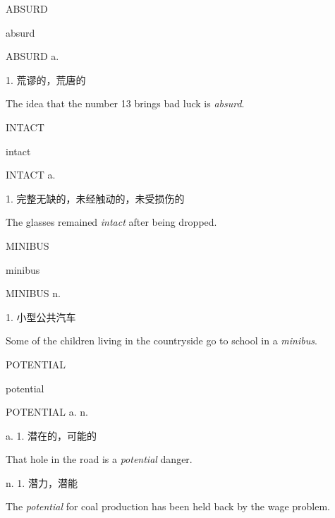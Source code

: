 \begin{flashcard}{
ABSURD

absurd
}
\begin{center}
ABSURD a. 
\end{center}
1. 荒谬的，荒唐的

The idea that the number 13 brings bad luck is \textit{absurd}.

\end{flashcard}
\begin{flashcard}{
INTACT

intact
}
\begin{center}
INTACT a. \textipa{[in\textprimstress t\ae kt]}
\end{center}
1. 完整无缺的，未经触动的，未受损伤的

The glasses remained \textit{intact} after being dropped.

\end{flashcard}
\begin{flashcard}{
MINIBUS

minibus
}
\begin{center}
MINIBUS n. 
\end{center}
1. 小型公共汽车

Some of the children living in the countryside go to school in a \textit{minibus}.

\end{flashcard}
\begin{flashcard}{
POTENTIAL

potential
}
\begin{center}
POTENTIAL a. n. 
\end{center}
a. 1. 潜在的，可能的

That hole in the road is a \textit{potential} danger.

n. 1. 潜力，潜能

The \textit{potential} for coal production has been held back by the wage problem.

\end{flashcard}
